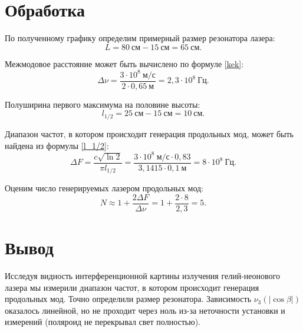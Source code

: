 \documentclass{MagicLabs}
\begin{document}
\section{Обработка}
По полученному графику определим примерный размер резонатора лазера: 
\[
	L = 80~см- 15~см = 65~см.
\]

Межмодовое расстояние может быть вычислено по формуле \eqref{kek}: 
\[
	\Delta\nu = \dfrac{3 \cdot 10^8~м/с}{2\cdot 0,65~м} = 2,3 \cdot 10^8~Гц.
\]


Полуширина первого максимума на половине высоты:
\[
	l_{1/2} = 25~см - 15~см = 10~см.
\]


Диапазон частот, в котором происходит генерация продольных мод, может быть 
найдена из формулы \eqref{l_1/2}:
\[
	\Delta F = \dfrac{c\sqrt{\ln2}}{\pi l_{1/2}} = \dfrac{3\cdot 10^8~м/с\cdot0,83}{3,1415\cdot0,1~м} =
	 8\cdot10^8~Гц.
\]


Оценим число генерируемых лазером продольных мод:
\[
	N\approx 1 + \dfrac{2\Delta F}{\Delta\nu} = 1 + \dfrac{2\cdot 8}{2,3} = 5.
\]
	

\section{Вывод}
Исследуя видность интерференционной картины излучения гелий-неонового лазера мы измерили
диапазон частот, в котором происходит генерация продольных мод. Точно определили размер резонатора. Зависимость $ \nu_3(|\cos\beta|) $ оказалось линейной, но не проходит
через ноль из-за неточности установки и измерений (поляроид не перекрывал свет полностью).	
\end{document}
